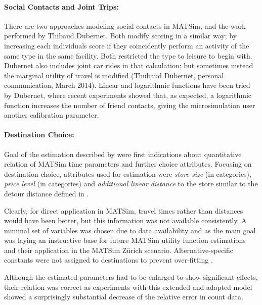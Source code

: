 \paragraph{Social Contacts and Joint Trips:}
There are two approaches modeling social contacts in MATSim, \citet[][]{Hackney_PhDThesis_2009} and the work performed by Thibaud Dubernet. Both modify scoring in a similar way; by increasing each individuals score if they coincidently perform an activity of the same type in the same facility. Both restricted the type to leisure to begin with. Dubernet also includes joint car rides in that calculation; but sometimes instead the marginal utility of travel is modified (Thubaud Dubernet, personal communication, March 2014). Linear and logarithmic functions have been tried by Dubernet, where recent experiments showed that, as expected, a logarithmic function increases the number of friend contacts, giving the microsimulation user another calibration parameter. 

\paragraph{Destination Choice:}
Goal of the estimation described by \citet[][]{Horni_PhDThesis_2013} were first indications about quantitative relation of MATSim time parameters and further choice attributes. Focusing on destination choice, attributes used for estimation were \emph{store size} (in categories), \emph{price level} (in categories) and \emph{additional linear distance} to the store similar to the detour distance defined in \citet[][]{ArentzeTimmermans_TRR_2007}.

Clearly, for direct application in MATSim, travel times rather than distances would have been better, but this information was not available consistently. A minimal set of variables was chosen due to data availability and as the main goal was laying an instructive base for future MATSim utility function estimations and their application in the MATSim Zürich scenario. Alternative-specific constants were not assigned to destinations to prevent over-fitting \citep[][]{BierlaireEtAl_TransScience_1997}.

Although the estimated parameters had to be enlarged to show significant effects, their relation was correct as experiments with this extended and adapted model showed a surprisingly substantial decrease of the relative error in count data.

